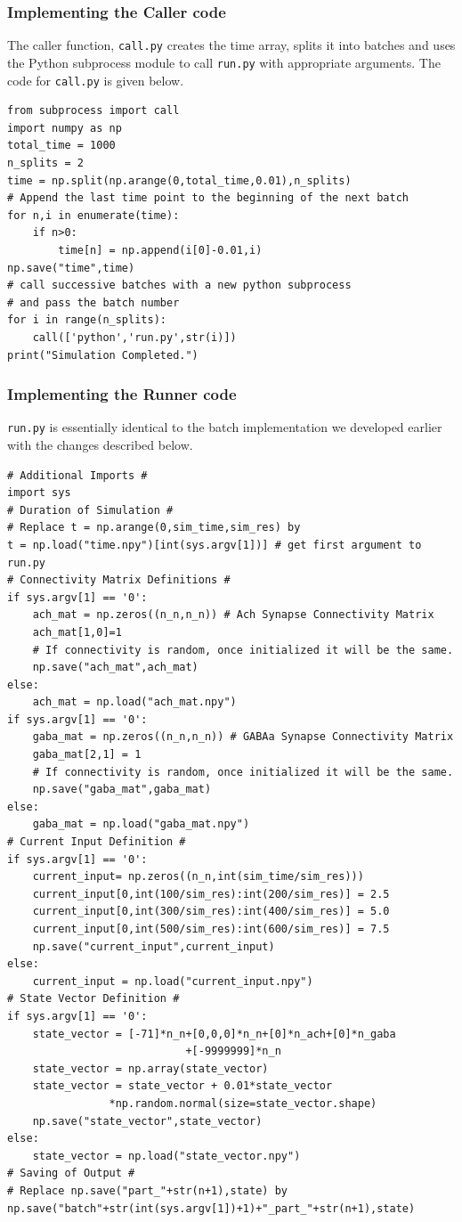 \documentclass[10pt,letterpaper]{article}
\begin{document}
\begin{nolinenumbers}
\subsubsection*{Implementing the Caller code}
The caller function, \texttt{call.py} creates the time array, splits it into batches and uses the Python subprocess module to call \texttt{run.py} with appropriate arguments. The code for \texttt{call.py} is given below.

\begin{verbatim}
from subprocess import call
import numpy as np
total_time = 1000
n_splits = 2
time = np.split(np.arange(0,total_time,0.01),n_splits)
# Append the last time point to the beginning of the next batch
for n,i in enumerate(time):
    if n>0:
        time[n] = np.append(i[0]-0.01,i)
np.save("time",time)
# call successive batches with a new python subprocess 
# and pass the batch number
for i in range(n_splits):
    call(['python','run.py',str(i)])
print("Simulation Completed.")
\end{verbatim}

\subsubsection*{Implementing the Runner code}

\texttt{run.py} is essentially identical to the batch implementation we developed earlier with the changes described below.

\begin{verbatim}
# Additional Imports #
import sys
# Duration of Simulation #
# Replace t = np.arange(0,sim_time,sim_res) by
t = np.load("time.npy")[int(sys.argv[1])] # get first argument to run.py
# Connectivity Matrix Definitions #
if sys.argv[1] == '0':
    ach_mat = np.zeros((n_n,n_n)) # Ach Synapse Connectivity Matrix
    ach_mat[1,0]=1
    # If connectivity is random, once initialized it will be the same.
    np.save("ach_mat",ach_mat)
else:
    ach_mat = np.load("ach_mat.npy")
if sys.argv[1] == '0':
    gaba_mat = np.zeros((n_n,n_n)) # GABAa Synapse Connectivity Matrix
    gaba_mat[2,1] = 1
    # If connectivity is random, once initialized it will be the same.
    np.save("gaba_mat",gaba_mat)
else:
    gaba_mat = np.load("gaba_mat.npy")
# Current Input Definition #
if sys.argv[1] == '0':
    current_input= np.zeros((n_n,int(sim_time/sim_res)))
    current_input[0,int(100/sim_res):int(200/sim_res)] = 2.5
    current_input[0,int(300/sim_res):int(400/sim_res)] = 5.0
    current_input[0,int(500/sim_res):int(600/sim_res)] = 7.5
    np.save("current_input",current_input)
else:
    current_input = np.load("current_input.npy")
# State Vector Definition #
if sys.argv[1] == '0':
    state_vector = [-71]*n_n+[0,0,0]*n_n+[0]*n_ach+[0]*n_gaba
    						+[-9999999]*n_n
    state_vector = np.array(state_vector)
    state_vector = state_vector + 0.01*state_vector
    			*np.random.normal(size=state_vector.shape)
    np.save("state_vector",state_vector)
else:
    state_vector = np.load("state_vector.npy")
# Saving of Output #
# Replace np.save("part_"+str(n+1),state) by
np.save("batch"+str(int(sys.argv[1])+1)+"_part_"+str(n+1),state)
\end{verbatim}


\end{nolinenumbers}
\end{document}
